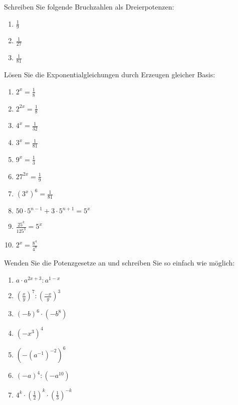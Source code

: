 Schreiben Sie folgende Bruchzahlen als Dreierpotenzen:

\begin{multicols}{2}
\begin{enumerate}[label=\alph*)]
  \item $\frac{1}{9}$
  \item $\frac{1}{27}$
    \item $\frac{1}{81}$
\end{enumerate}
\end{multicols}

Lösen Sie die Exponentialgleichungen durch Erzeugen gleicher Basis:

\begin{multicols}{3}
\begin{enumerate}[label=\alph*)]
\item $2^x=\frac{1}{8}$
\item $2^{2x}=\frac{1}{8}$
\item $4^x=\frac{1}{32}$
\item $3^x=\frac{1}{81}$
  \item $9^x=\frac{1}{3}$
  \item $27^{2x}=\frac{1}{9}$
  \item $\left(3^x\right)^6 = \frac{1}{81}$
    \item $50\cdot 5^{n-1} + 3\cdot 5^{n+1} = 5^x$
    \item $\frac{25^k}{125^3} = 5^x$
      \item $2^x=\frac{8^4}{4^8}$
\end{enumerate}
\end{multicols}


Wenden Sie die Potenzgesetze an und schreiben Sie so einfach wie
möglich:
\begin{multicols}{3}
\begin{enumerate}[label=\alph*)]
\item $a\cdot a^{2x+3} : a^{1-x}$
\item $\left(\frac{x}{y}\right)^7 : \left(\frac{-x}{y}\right)^3$
\item $(-b)^6 \cdot (-b^8)$
\item $(-x^3)^4$
\item $\left( -(a^{-1})^{-2} \right)^6$
\item $(-a)^4 : (-a^{10})$
  \item $4^k \cdot \left( \frac{1}{2} \right)^k \cdot \left(
    \frac{1}{3} \right)^{-k}$
\end{enumerate}
\end{multicols}


